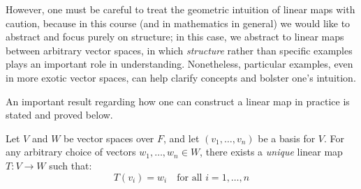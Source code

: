 \documentclass[../linear_algebra_and_groups.tex]{subfiles}
\begin{document}
However, one must be careful to treat the geometric intuition of linear maps with caution, because in this course (and in mathematics in general) we would like to abstract and focus purely on structure; in this case, we abstract to linear maps between arbitrary vector spaces, in which \textit{structure} rather than specific examples plays an important role in understanding. Nonetheless, particular examples, even in more exotic vector spaces, can help clarify concepts and bolster one's intuition. 

An important result regarding how one can construct a linear map in practice is stated and proved below.

\begin{proposition}
    \begin{shaded*}
        Let $V$ and $W$ be vector spaces over $F$, and let $(v_1, \dots, v_n)$ be a basis for $V$. For any arbitrary choice of vectors $w_1, \dots, w_n \in W$, there exists a \textit{unique} linear map $T: V \to W$ such that:
        \[ T(v_i) = w_i \quad \text{for all } i = 1, \dots, n \]
    \end{shaded*}
\end{proposition}
\end{document}
